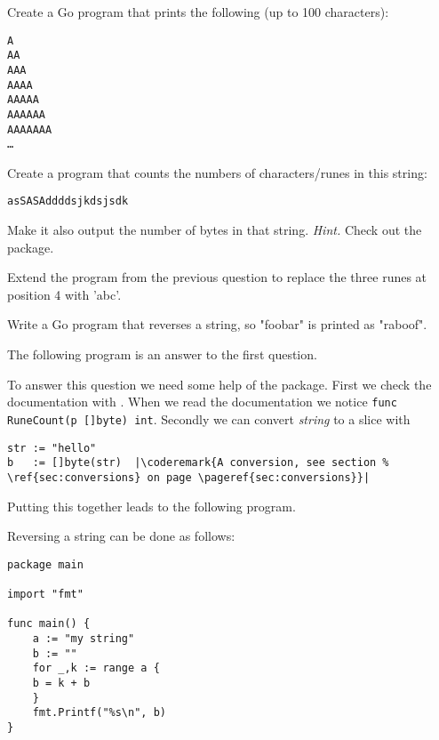\begin{Exercise}[title={Strings},difficulty=1]
\label{ex:strings}
\Question \label{ex:strings q1} Create a Go program that prints
the following (up to 100 characters):
\begin{alltt}
A
AA
AAA
AAAA
AAAAA
AAAAAA
AAAAAAA
\ldots
\end{alltt}


\Question \label{ex:strings q2} Create a program that counts
the numbers of characters/runes in this string:
\begin{alltt}
asSASA ddd dsjkdsjs dk
\end{alltt}
Make it also output the number of bytes in that string.
\emph{Hint.} Check out the  package.

\Question \label{ex:string q3} Extend the program from
the previous question to replace the three runes at
position 4 with 'abc'.

\Question \label{ex:string q4} Write a Go program
that reverses a string, so "foobar" is printed as "raboof".

\end{Exercise}

\begin{Answer}

\Question The following program is an answer to the first question.


\Question To answer this question we need some help of
the  package. First we check the documentation
with . When we read the documentation
we notice \lstinline{func RuneCount(p []byte) int}. Secondly
we can convert \emph{string} to a  slice with
\begin{lstlisting}
str := "hello"
b   := []byte(str)  |\coderemark{A conversion, see section %
\ref{sec:conversions} on page \pageref{sec:conversions}}|
\end{lstlisting}

Putting this together leads to the following program.


\Question Reversing a string can be done as follows:
\begin{lstlisting}
package main

import "fmt"

func main() {
    a := "my string"
    b := ""
    for _,k := range a {
	b = k + b
    }
    fmt.Printf("%s\n", b)
}
\end{lstlisting}

\end{Answer}
